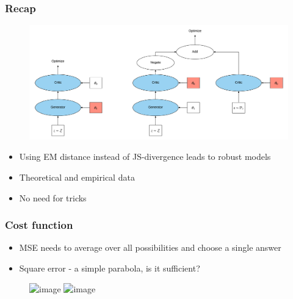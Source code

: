 \documentclass{Bredelebeamer}
\begin{document}
\begin{frame}
	\frametitle{Recap}
	\begin{figure}[h!]
	\centering
	\includegraphics[width=\textwidth]{GAN_optimization_two_step.png}
	\end{figure}
	\begin{itemize}
		\item Using EM distance instead of JS-divergence leads to robust models
		\item Theoretical and empirical data
		\item No need for tricks 
	\end{itemize}
\end{frame}
\begin{frame}
	\frametitle{Cost function}
	\begin{itemize}
		\item MSE needs to average over all possibilities and choose a single answer
		\item Square error - a simple parabola, is it sufficient?
	\end{itemize}
	\begin{figure}[h!]
		\centering
		\includegraphics<1>[width=\textwidth]{predict_frame.png}
		\includegraphics<2->[width=\textwidth]{mse_vs_adversarial.png}
	\end{figure}
\end{frame}
\end{document}
